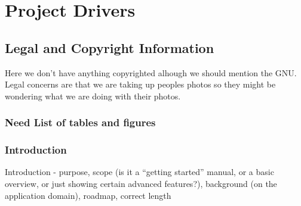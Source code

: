 \documentclass{scrreprt}
\begin{document}
\newcommand{\requirement}[9]{%
\fbox{\parbox{\textwidth}{%
\parbox[t]{.333\textwidth}{\raggedright%
\textbf{Req. \#}: \refstepcounter{RequirementNumber} \arabic{RequirementNumber} \label{#1}}%
\parbox[t]{.333\textwidth}{\centering%
\textbf{Req. Type}: #2}%
\parbox[t]{.333\textwidth}{\raggedleft%
\textbf{Use Case \#}: \ref{#3}}
\newline\\
\textbf{Description}: #4\\\\
\textbf{Rationale}: #5\\\\
\textbf{Originator}: #6\\\\
\textbf{Fit Criterion}: #7\\\\
\textbf{Priority}: #8 \hfill \textbf{History}: #9\\\\
}}}

\chapter{Project Drivers}

\section{Legal and Copyright Information}

Here we don't have anything copyrighted alhough we should 
mention the GNU.  Legal concerns are that we are taking 
up peoples photos so they might be wondering what we are 
doing with their photos.

\subsection{Need List of tables and figures}

\subsection{Introduction}

Introduction - purpose, scope (is it a “getting started” manual, or a basic overview, or just
showing certain advanced features?), background (on the application domain), roadmap,
correct length
\end{document}
